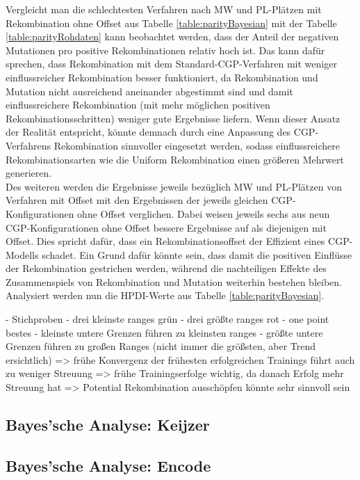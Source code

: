 Vergleicht man die schlechtesten Verfahren nach MW und PL-Plätzen mit Rekombination ohne Offset aus Tabelle \ref{table:parityBayesian} mit der Tabelle \ref{table:parityRohdaten} kann beobachtet werden, dass der Anteil der negativen Mutationen pro positive Rekombinationen relativ hoch ist.
Das kann dafür sprechen, dass Rekombination mit dem Standard-CGP-Verfahren mit weniger einflussreicher Rekombination besser funktioniert, da Rekombination und Mutation nicht ausreichend aneinander abgestimmt sind und damit einflussreichere Rekombination (mit mehr möglichen positiven Rekombinationsschritten) weniger gute Ergebnisse liefern.
Wenn dieser Ansatz der Realität entspricht, könnte demnach durch eine Anpassung des CGP-Verfahrens Rekombination sinnvoller eingesetzt werden, sodass einflussreichere Rekombinationsarten wie die Uniform Rekombination einen größeren Mehrwert generieren.\\
Des weiteren werden die Ergebnisse jeweils bezüglich MW und PL-Plätzen von Verfahren mit Offset mit den Ergebnissen der jeweils gleichen CGP-Konfigurationen ohne Offset verglichen.
Dabei weisen jeweils sechs aus neun CGP-Konfigurationen ohne Offset bessere Ergebnisse auf als diejenigen mit Offset.
Dies spricht dafür, dass ein Rekombinationsoffset der Effizient eines CGP-Modells schadet.
Ein Grund dafür könnte sein, dass damit die positiven Einflüsse der Rekombination gestrichen werden, während die nachteiligen Effekte des Zusammenspiels von Rekombination und Mutation weiterhin bestehen bleiben.\\
Analysiert werden nun die HPDI-Werte aus Tabelle \ref{table:parityBayesian}.

- Stichproben
- drei kleinste ranges grün
- drei größte ranges rot
- one point bestes
- kleinste untere Grenzen führen zu kleinsten ranges
- größte untere Grenzen führen zu großen Ranges (nicht immer die größsten, aber Trend ersichtlich)
=> frühe Konvergenz der frühesten erfolgreichen Trainings führt auch zu weniger Streuung
=> frühe Trainingserfolge wichtig, da danach Erfolg mehr Streuung hat
=> Potential Rekombination ausschöpfen könnte sehr sinnvoll sein



\subsection{Bayes'sche Analyse: Keijzer}
\label{subsec:bayesKeijzer}


\subsection{Bayes'sche Analyse: Encode}
\label{subsec:bayesEncode}



